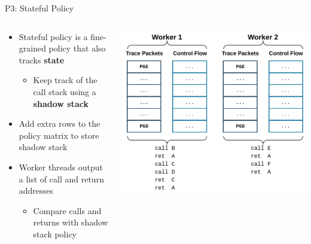 \documentclass[12pt, dvipsnames, aspectratio=169]{beamer}
\begin{document}
\begin{frame}[c]{P3: Stateful Policy}{}
  \begin{columns}
    \begin{column}{0.5\textwidth}
      \begin{itemize}
        \item Stateful policy is a fine-grained policy that also tracks {\bf state}
        \begin{itemize}
          \item Keep track of the call stack using a {\bf shadow stack}
        \end{itemize}

        \vspace{1.5em}
        \item Add extra rows to the policy matrix to store shadow stack

        \vspace{1.5em}
        \item Worker threads output a list of call and return addresses
        \begin{itemize}
          \item Compare calls and returns with shadow stack policy
        \end{itemize}
      \end{itemize}
    \end{column}
    \begin{column}{0.5\textwidth}
      \color{black}
      \includegraphics[width=1\columnwidth]{figs/stateful_policy.pdf}
    \end{column}
  \end{columns}

\end{frame}
\end{document}
